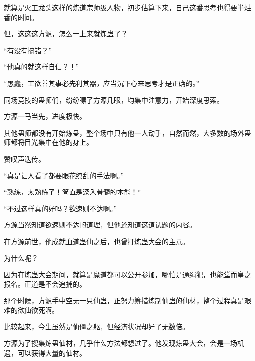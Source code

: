 \begin{this_body}
就算是火工龙头这样的炼道宗师级人物，初步估算下来，自己这番思考也得要半炷香的时间。

但，这这这方源，怎么一上来就炼蛊了？

“有没有搞错？”

“他真的就这样自信？！”

“愚蠢，工欲善其事必先利其器，应当沉下心来思考才是正确的。”

同场竞技的蛊师们，纷纷瞟了方源几眼，均集中注意力，开始深度思索。

方源一马当先，进度极快。

其他蛊师都没有开始炼蛊，整个场中只有他一人动手，自然而然，大多数的场外蛊师都将目光集中在他的身上。

赞叹声迭传。

“真是让人看了都要眼花缭乱的手法啊。”

“熟练，太熟练了！简直是深入骨髓的本能！”

“不过这样真的好吗？欲速则不达啊。”

方源当然知道欲速则不达的道理，但他还知道这道试题的内容。

在方源前世，他成就血道蛊仙之后，也曾打炼蛊大会的主意。

为什么呢？

因为在炼蛊大会期间，就算是魔道都可以公开参加，哪怕是通缉犯，也能堂而皇之报名。正道是不会追捕的。

那个时候，方源手中空无一只仙蛊，正努力筹措炼制仙蛊的仙材，整个过程真是艰难的欲仙欲死啊。

比较起来，今生虽然是仙僵之躯，但经济状况却好了无数倍。

方源为了搜集炼蛊仙材，几乎什么方法都想过了。他发现炼蛊大会，会是一场机遇，可以获得大量的仙材。

\end{this_body}

